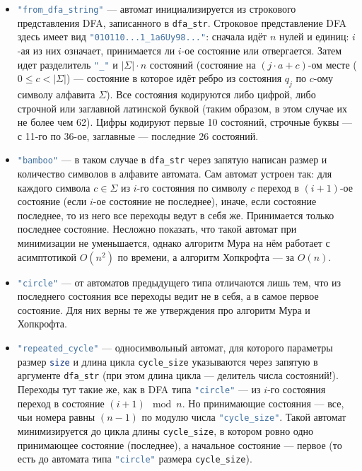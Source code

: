 \documentclass{article}
\begin{document}
 \begin{itemize}
  \item[\ding{82}] \lstinline[language=bash]!"from_dfa_string"! --- автомат инициализируется из строкового представления DFA, записанного в \lstinline[language=bash]!dfa_str!. Строковое представление DFA здесь имеет вид \lstinline[language=bash]!"010110...1_1a6Uy98..."!: сначала идёт $n$ нулей и единиц: $i$-ая из них означает, принимается ли $i$-ое состояние или отвергается. Затем идет разделитель \lstinline[language=bash]!"_"! и $|\Sigma| \cdot n$ состояний (состояние на $(j \cdot a + c)$-ом месте ($0 \le c < |\Sigma|$) --- состояние в которое идёт ребро из состояния $q_j$ по $c$-ому символу алфавита $\Sigma$). Все состояния кодируются либо цифрой, либо строчной или заглавной латинской буквой (таким образом, в этом случае их не более чем 62). Цифры кодируют первые 10 состояний, строчные буквы --- с 11-го по 36-ое, заглавные --- последние 26 состояний.
  \item[\ding{82}] \lstinline[language=bash]!"bamboo"! --- в таком случае в \lstinline[language=C++]!dfa_str! через запятую написан размер и количество символов в алфавите автомата. Сам автомат устроен так: для каждого символа $c\in \Sigma$ из $i$-го состояния по символу $c$ переход в $(i + 1)$-ое состояние (если $i$-ое состояние не последнее), иначе, если состояние последнее, то из него все переходы ведут в себя же. Принимается только последнее состояние. Несложно показать, что такой автомат при минимизации не уменьшается, однако алгоритм Мура на нём работает с асимптотикой $O(n^2)$ по времени, а алгоритм Хопкрофта --- за $O(n)$.
  \item[\ding{82}] \lstinline[language=bash]!"circle"! --- от автоматов предыдущего типа отличаются лишь тем, что из последнего состояния все переходы ведит не в себя, а в самое первое состояние. Для них верны те же утверждения про алгоритм Мура и Хопкрофта.
  \item[\ding{82}] \lstinline[language=bash]!"repeated_cycle"! --- односимвольный автомат, для которого параметры размер \lstinline[language=bash]!size! и длина цикла \lstinline[language=bash]!cycle_size! указываются через запятую в аргументе \lstinline[language=C++]!dfa_str! (при этом длина цикла --- делитель числа состояний!). Переходы тут такие же, как в DFA типа \lstinline[language=bash]!"circle"! --- из $i$-го состояния переход в состояние $(i + 1) \mod n$. Но принимающие состояния --- все, чьи номера равны $(n - 1)$ по модулю числа \lstinline[language=bash]!"cycle_size"!. Такой автомат минимизируется до цикла длины \lstinline[language=bash]!cycle_size!, в котором ровно одно принимающее состояние (последнее), а начальное состояние --- первое (то есть до автомата типа \lstinline[language=bash]!"circle"! размера \lstinline[language=bash]!cycle_size!).

\end{itemize}
\end{document}
